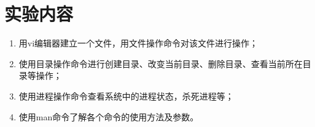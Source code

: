 \documentclass[cs4size,a4paper,nofonts]{ctexart}
\begin{document}

\setcounter{part}{0}
\def\today{2015~年~5~月~15~日}


\iffalse
\section{实验目的}
\begin{enumerate}
\item 熟悉Linux操作系统的基本操作命令；
\item 通过在Linux环境下对进程的基本操作，认识进程并区分与程序的区别。
\end{enumerate}

\section{实验环境}
一台装有Linux操作系统（Fedora 7），至少具有256M内存的微机。

\section{预备知识}
\begin{enumerate}
\item vi编辑器的使用
\item 系统管理命令\\
login, logout, man
\item 文件操作命令\\
ls, cat, cp, mv , rm,
\item 目录操作命令\\
cd, mkdir, rmdir, pwd
\item 进程操作命令\\
ps, kill, pstree
\end{enumerate}
\fi

\section{实验内容}
\begin{enumerate}[label={(\arabic*)}]
\item 用vi编辑器建立一个文件，用文件操作命令对该文件进行操作；
\item 使用目录操作命令进行创建目录、改变当前目录、删除目录、查看当前所在目录等操作；
\item 使用进程操作命令查看系统中的进程状态，杀死进程等；
\item 使用man命令了解各个命令的使用方法及参数。
\end{enumerate}
\end{document}

